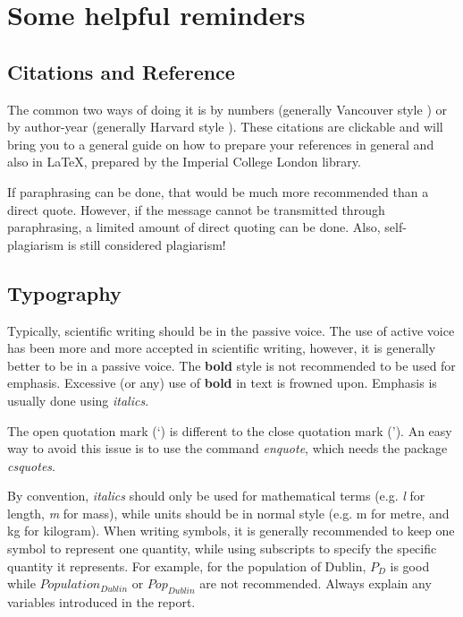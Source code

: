 \chapter{Some helpful reminders}
\section{Citations and Reference}
The common two ways of doing it is by numbers (generally Vancouver style \cite{Imper_VancouverGuide, Imper_VancouverGuideLaTeX}) or by author-year (generally Harvard style \cite{Imper_HarvGuide, Imper_HarvGuideLaTeX}). These citations are clickable and will bring you to a general guide on how to prepare your references in general and also in \LaTeX, prepared by the Imperial College London library. 

If paraphrasing can be done, that would be much more recommended than a direct quote. However, if the message cannot be transmitted through paraphrasing, a limited amount of direct quoting can be done. Also, self-plagiarism is still considered plagiarism!

\section{Typography} \label{f:typography}
Typically, scientific writing should be in the passive voice. The use of active voice has been more and more accepted in scientific writing, however, it is generally better to be in a passive voice. The \textbf{bold} style is not recommended to be used for emphasis. Excessive (or any) use of \textbf{bold} in text is frowned upon. Emphasis is usually done using \emph{italics}. 

The open quotation mark (`) is different to the close quotation mark ('). An easy way to avoid this issue is to use the command \textit{enquote}, which needs the package \textit{csquotes}. 

By convention, \textit{italics} should only be used for mathematical terms (e.g. \textit{l} for length, \textit{m} for mass), while units should be in normal style (e.g. m for metre, and kg for kilogram). When writing symbols, it is generally recommended to keep one symbol to represent one quantity, while using subscripts to specify the specific quantity it represents. For example, for the population of Dublin, $P_{D}$ is good while $Population_{Dublin}$ or $Pop_{Dublin}$ are not recommended. Always explain any variables introduced in the report. 